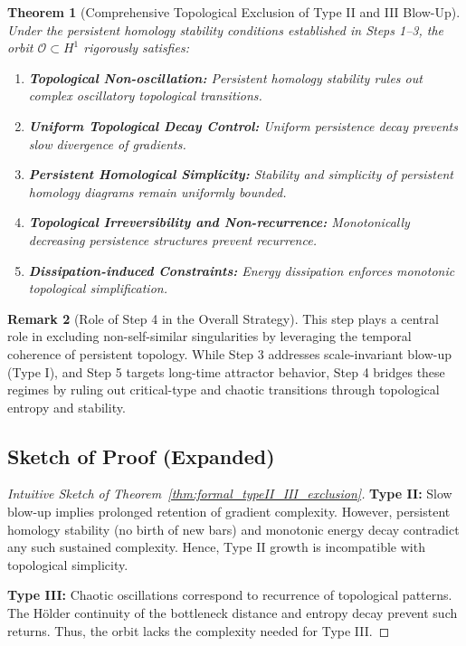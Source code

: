 \documentclass[11pt]{article}
\newtheorem{theorem}{Theorem}[section]
\theoremstyle{definition}
\newtheorem{remark}[theorem]{Remark}
\begin{document}
\begin{theorem}[Comprehensive Topological Exclusion of Type II and III Blow-Up]
\label{thm:comprehensive_exclusion}
Under the persistent homology stability conditions established in Steps 1--3, the orbit $\mathcal{O} \subset H^1$ rigorously satisfies:
\begin{enumerate}
  \item \textbf{Topological Non-oscillation:} Persistent homology stability rules out complex oscillatory topological transitions.
  \item \textbf{Uniform Topological Decay Control:} Uniform persistence decay prevents slow divergence of gradients.
  \item \textbf{Persistent Homological Simplicity:} Stability and simplicity of persistent homology diagrams remain uniformly bounded.
  \item \textbf{Topological Irreversibility and Non-recurrence:} Monotonically decreasing persistence structures prevent recurrence.
  \item \textbf{Dissipation-induced Constraints:} Energy dissipation enforces monotonic topological simplification.
\end{enumerate}
\end{theorem}

\begin{remark}[Role of Step 4 in the Overall Strategy]
This step plays a central role in excluding non-self-similar singularities by leveraging the temporal coherence of persistent topology. While Step 3 addresses scale-invariant blow-up (Type I), and Step 5 targets long-time attractor behavior, Step 4 bridges these regimes by ruling out critical-type and chaotic transitions through topological entropy and stability.
\end{remark}

\subsection*{Sketch of Proof (Expanded)}

\begin{proof}[Intuitive Sketch of Theorem~\ref{thm:formal_typeII_III_exclusion}]
\textbf{Type II:} Slow blow-up implies prolonged retention of gradient complexity. However, persistent homology stability (no birth of new bars) and monotonic energy decay contradict any such sustained complexity. Hence, Type II growth is incompatible with topological simplicity.

\textbf{Type III:} Chaotic oscillations correspond to recurrence of topological patterns. The Hölder continuity of the bottleneck distance and entropy decay prevent such returns. Thus, the orbit lacks the complexity needed for Type III.
\end{proof}
\end{document}
